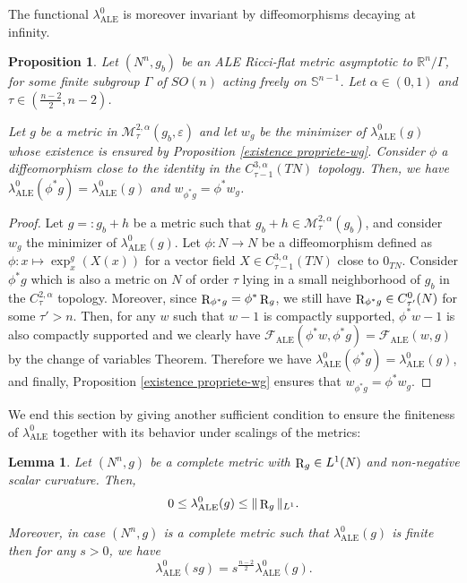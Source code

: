 \documentclass[a4paper,11pt,reqno]{amsart}
\newtheorem{lemma}[defn]{Lemma}
\newtheorem{prop}[defn]{Proposition}
\def\RR{\mathbb{R}}
\def\R{\mathop{\rm R}\nolimits}
\numberwithin{equation}{section}
\begin{document}
	The functional $\lambda_{\operatorname{ALE}}^0$ is moreover invariant by diffeomorphisms decaying at infinity.
	\begin{prop}\label{inv-diff-lambda}
		Let $(N^n,g_b)$ be an ALE Ricci-flat metric asymptotic to $\RR^n\slash\Gamma$, for some finite subgroup $\Gamma$ of $SO(n)$ acting freely on $\mathbb{S}^{n-1}$. Let $\alpha\in (0,1)$ and $\tau\in(\frac{n-2}{2},n-2)$.
		
		Let $g$ be a metric in $ \mathcal{M}^{2,\alpha}_{\tau}(g_b,\varepsilon)$ and let $w_g$ be the minimizer of $\lambda_{\operatorname{ALE}}^0(g)$ whose existence is ensured by Proposition \ref{existence propriete-wg}. Consider $\phi$ a diffeomorphism close to the identity in the $C^{3,\alpha}_{\tau-1}(TN)$ topology. Then, we have $\lambda_{\operatorname{ALE}}^0(\phi^*g) = \lambda_{\operatorname{ALE}}^0(g)$ and $w_{\phi^*g} = \phi^*w_g$.
	\end{prop}
	\begin{proof}
		Let $g=:g_b+h$ be a metric such that $g_b+h\in \mathcal{M}^{2,\alpha}_{\tau}(g_b)$, and consider $w_g$ the minimizer of $\lambda_{\operatorname{ALE}}^0(g)$. Let $\phi : N\to N$ be a diffeomorphism defined as $\phi :x \mapsto \exp_x^{g}(X(x))$ for a vector field $X\in C^{3,\alpha}_{\tau-1}(TN)$ close to $0_{TN}$. Consider $\phi^*g$ which is also a  metric on $N$ of order $\tau$ lying in a small neighborhood of $g_b$ in the $C^{2,\alpha}_{\tau}$ topology. Moreover, since $\R_{\phi^*g}= \phi^*\R_g$, we still have $\R_{\phi^*g}\in C^0_{\tau'}(N)$ for some $\tau'>n$. Then, for any $w$ such that $w-1$ is compactly supported, $\phi^*w-1$ is also compactly supported and we clearly have $\mathcal{F}_{\operatorname{ALE}}(\phi^*w,\phi^*g) = \mathcal{F}_{\operatorname{ALE}}(w,g)$ by the change of variables Theorem. Therefore we have $\lambda_{\operatorname{ALE}}^0(\phi^*g) = \lambda_{\operatorname{ALE}}^0(g)$, and finally, Proposition \ref{existence propriete-wg} ensures that $w_{\phi^*g} = \phi^*w_g$.
	\end{proof}
	We end this section by giving another sufficient condition to ensure the finiteness of $\lambda_{\operatorname{ALE}}^0$ together with its behavior under scalings of the metrics: 	
	\begin{lemma}\label{scaling lambdaALE}
		Let $(N^n,g)$ be a complete metric with $\R_g\in L^1(N)$ and non-negative scalar curvature. Then, $$0\leq \lambda_{\operatorname{ALE}}^0(g)\leq \|\R_g\|_{L^1}.$$
		
		Moreover, in case $(N^n,g)$ is a complete metric such that $\lambda_{\operatorname{ALE}}^0(g)$ is finite then for any $s>0$, we have $$\lambda_{\operatorname{ALE}}^0(sg) = s^{\frac{n-2}{2}}\lambda_{\operatorname{ALE}}^0(g).$$
	\end{lemma}
\end{document}
